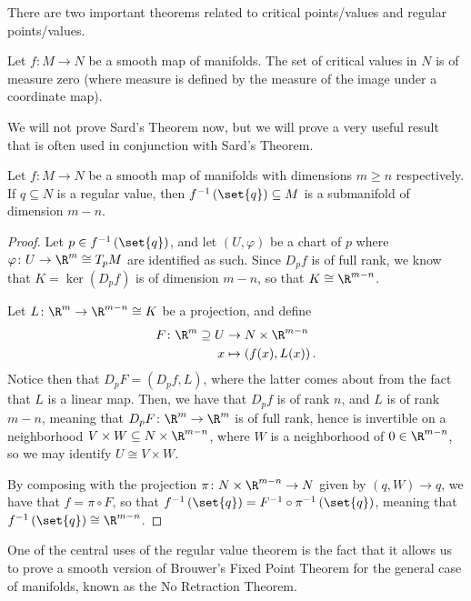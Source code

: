 \documentclass[10pt]{mypackage}
\begin{document}
There are two important theorems related to critical points/values and regular points/values. 
\begin{theorem}
  Let $f\colon M\rightarrow N$ be a smooth map of manifolds. The set of critical values in $N$ is of measure zero (where measure is defined by the measure of the image under a coordinate map).
\end{theorem}
We will not prove Sard's Theorem now, but we will prove a very useful result that is often used in conjunction with Sard's Theorem.
\begin{theorem}
  Let $f\colon M\rightarrow N$ be a smooth map of manifolds with dimensions $m\geq n$ respectively. If $q\subseteq N$ is a regular value, then $f^{-1}\left( \set{q} \right)\subseteq M$ is a submanifold of dimension $m-n$.
\end{theorem}
\begin{proof}
  Let $p\in f^{-1}\left( \set{q} \right)$, and let $\left( U,\varphi \right)$ be a chart of $p$ where $\varphi\colon U\rightarrow \R^{m}\cong T_pM$ are identified as such. Since $D_pf$ is of full rank, we know that $K = \ker\left( D_pf \right)$ is of dimension $m-n$, so that $K\cong \R^{m-n}$.\newline

  Let $L\colon \R^{m}\rightarrow \R^{m-n}\cong K$ be a projection, and define
  \begin{align*}
    F\colon \R^{m}\supseteq U &\rightarrow N\times \R^{m-n}\\
    x &\mapsto \left( f(x),L(x) \right).
  \end{align*}
  Notice then that $D_pF = \left( D_pf,L \right)$, where the latter comes about from the fact that $L$ is a linear map. Then, we have that $D_pf$ is of rank $n$, and $L$ is of rank $m-n$, meaning that $D_pF\colon \R^{m}\rightarrow \R^{m}$ is of full rank, hence is invertible on a neighborhood $V\times W\subseteq N\times \R^{m-n}$, where $W$ is a neighborhood of $0\in \R^{m-n}$, so we may identify $U\cong V\times W$.\newline

  By composing with the projection $\pi\colon N\times \R^{m-n}\rightarrow N$ given by $\left( q,W \right)\rightarrow q$, we have that $f = \pi\circ F$, so that $f^{-1}\left( \set{q} \right) = F^{-1}\circ \pi^{-1}\left( \set{q} \right)$, meaning that $f^{-1}\left( \set{q} \right)\cong \R^{m-n}$.
\end{proof}
One of the central uses of the regular value theorem is the fact that it allows us to prove a smooth version of Brouwer's Fixed Point Theorem for the general case of manifolds, known as the No Retraction Theorem.
\end{document}
